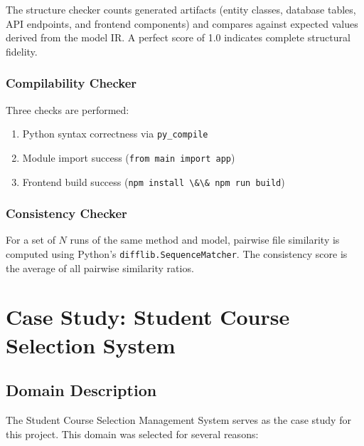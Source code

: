 \documentclass[11pt,a4paper]{article}
\begin{document}
The structure checker counts generated artifacts (entity classes, database tables, API endpoints, and frontend components) and compares against expected values derived from the model IR. A perfect score of 1.0 indicates complete structural fidelity.

\subsubsection{Compilability Checker}

Three checks are performed:
\begin{enumerate}[leftmargin=*]
    \item Python syntax correctness via {\lstinline|py_compile|}
    \item Module import success ({\lstinline|from main import app|})
    \item Frontend build success ({\lstinline|npm install \&\& npm run build|})
\end{enumerate}

\subsubsection{Consistency Checker}

For a set of $N$ runs of the same method and model, pairwise file similarity is computed using Python's {\lstinline|difflib.SequenceMatcher|}. The consistency score is the average of all pairwise similarity ratios.

\newpage
\section{Case Study: Student Course Selection System}
\label{sec:casestudy}

\subsection{Domain Description}

The Student Course Selection Management System serves as the case study for this project. This domain was selected for several reasons:
\end{document}
